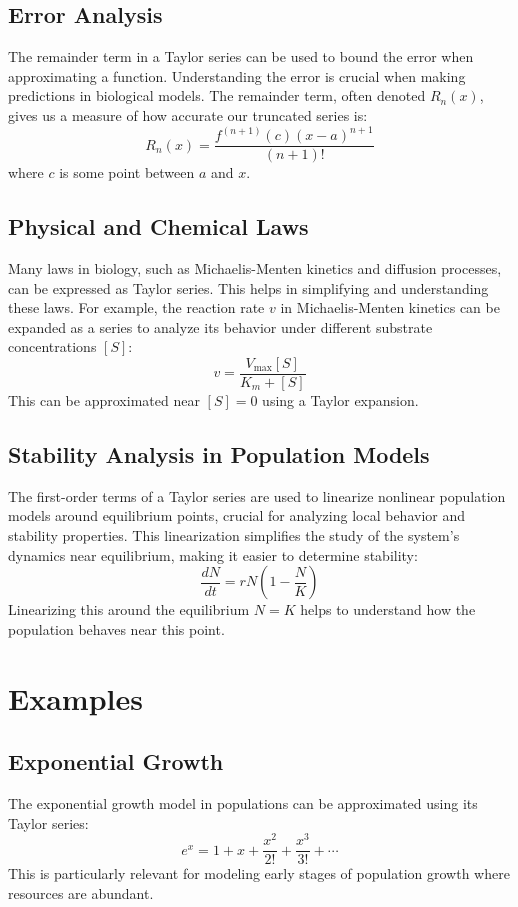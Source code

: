 \documentclass{article}
\begin{document}
\subsection{Error Analysis}
The remainder term in a Taylor series can be used to bound the error when approximating a function. Understanding the error is crucial when making predictions in biological models. The remainder term, often denoted $R_n(x)$, gives us a measure of how accurate our truncated series is:
\begin{equation}
R_n(x) = \frac{f^{(n+1)}(c)(x-a)^{n+1}}{(n+1)!}
\end{equation}
where $c$ is some point between $a$ and $x$.

\subsection{Physical and Chemical Laws}
Many laws in biology, such as Michaelis-Menten kinetics and diffusion processes, can be expressed as Taylor series. This helps in simplifying and understanding these laws. For example, the reaction rate $v$ in Michaelis-Menten kinetics can be expanded as a series to analyze its behavior under different substrate concentrations $[S]$:
\begin{equation}
v = \frac{V_{\max}[S]}{K_m + [S]}
\end{equation}
This can be approximated near $[S] = 0$ using a Taylor expansion.

\subsection{Stability Analysis in Population Models}
The first-order terms of a Taylor series are used to linearize nonlinear population models around equilibrium points, crucial for analyzing local behavior and stability properties. This linearization simplifies the study of the system's dynamics near equilibrium, making it easier to determine stability:
\begin{equation}
\frac{dN}{dt} = rN\left(1 - \frac{N}{K}\right)
\end{equation}
Linearizing this around the equilibrium $N = K$ helps to understand how the population behaves near this point.

\section{Examples}
\subsection{Exponential Growth}
The exponential growth model in populations can be approximated using its Taylor series:
\begin{equation}
e^x = 1 + x + \frac{x^2}{2!} + \frac{x^3}{3!} + \cdots
\end{equation}
This is particularly relevant for modeling early stages of population growth where resources are abundant.
\end{document}
